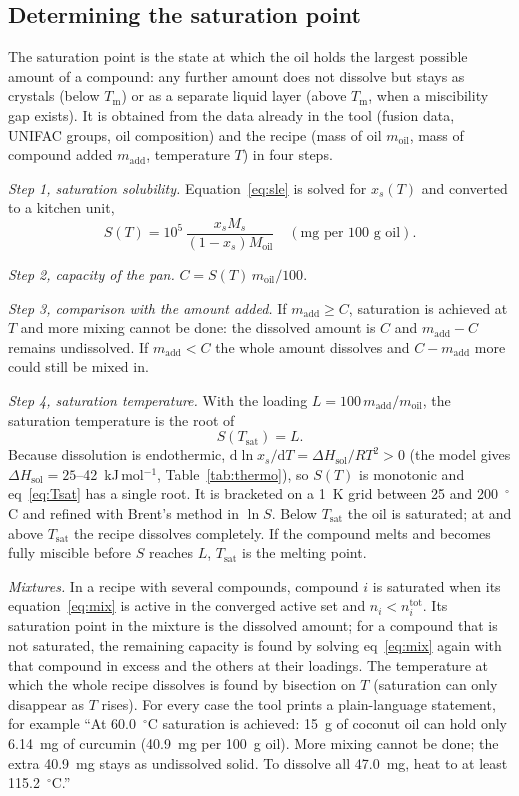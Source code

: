 \documentclass[journal=jceaax,manuscript=article,layout=twocolumn]{achemso}
\begin{document}
\subsection{Determining the saturation point}
\label{sec:satmethod}
The saturation point is the state at which the oil holds the largest possible amount of a compound: any further amount does not dissolve but stays as crystals (below $T_\mathrm{m}$) or as a separate liquid layer (above $T_\mathrm{m}$, when a miscibility gap exists). It is obtained from the data already in the tool (fusion data, UNIFAC groups, oil composition) and the recipe (mass of oil $m_\mathrm{oil}$, mass of compound added $m_\mathrm{add}$, temperature $T$) in four steps.

\textit{Step 1, saturation solubility.} Equation~\ref{eq:sle} is solved for $x_s(T)$ and converted to a kitchen unit,
\begin{equation}
S(T)=10^5\,\frac{x_s M_s}{(1-x_s)M_\mathrm{oil}}\quad(\text{mg per 100 g oil}).
\label{eq:S}
\end{equation}

\textit{Step 2, capacity of the pan.} $C=S(T)\,m_\mathrm{oil}/100$.

\textit{Step 3, comparison with the amount added.} If $m_\mathrm{add}\ge C$, saturation is achieved at $T$ and more mixing cannot be done: the dissolved amount is $C$ and $m_\mathrm{add}-C$ remains undissolved. If $m_\mathrm{add}<C$ the whole amount dissolves and $C-m_\mathrm{add}$ more could still be mixed in.

\textit{Step 4, saturation temperature.} With the loading $L=100\,m_\mathrm{add}/m_\mathrm{oil}$, the saturation temperature is the root of
\begin{equation}
S(T_\mathrm{sat})=L.
\label{eq:Tsat}
\end{equation}
Because dissolution is endothermic, $\mathrm{d}\ln x_s/\mathrm{d}T=\Delta H_\mathrm{sol}/RT^2>0$ (the model gives $\Delta H_\mathrm{sol}=25$--42~kJ\,mol$^{-1}$, Table~\ref{tab:thermo}), so $S(T)$ is monotonic and eq~\ref{eq:Tsat} has a single root. It is bracketed on a 1~K grid between 25 and 200~$^\circ$C and refined with Brent's method in $\ln S$. Below $T_\mathrm{sat}$ the oil is saturated; at and above $T_\mathrm{sat}$ the recipe dissolves completely. If the compound melts and becomes fully miscible before $S$ reaches $L$, $T_\mathrm{sat}$ is the melting point.

\textit{Mixtures.} In a recipe with several compounds, compound $i$ is saturated when its equation~\ref{eq:mix} is active in the converged active set and $n_i<n_i^\mathrm{tot}$. Its saturation point in the mixture is the dissolved amount; for a compound that is not saturated, the remaining capacity is found by solving eq~\ref{eq:mix} again with that compound in excess and the others at their loadings. The temperature at which the whole recipe dissolves is found by bisection on $T$ (saturation can only disappear as $T$ rises). For every case the tool prints a plain-language statement, for example ``At 60.0~$^\circ$C saturation is achieved: 15~g of coconut oil can hold only 6.14~mg of curcumin (40.9~mg per 100~g oil). More mixing cannot be done; the extra 40.9~mg stays as undissolved solid. To dissolve all 47.0~mg, heat to at least 115.2~$^\circ$C.''
\end{document}
